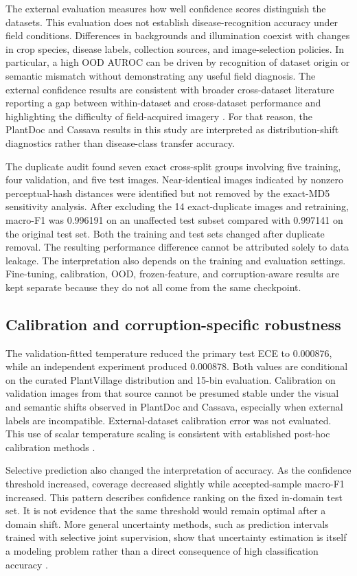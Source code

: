 \documentclass{sbc2023}%
\begin{document}
The external evaluation measures how well confidence scores distinguish the datasets. This evaluation does not establish disease-recognition accuracy under field conditions. Differences in backgrounds and illumination coexist with changes in crop species, disease labels, collection sources, and image-selection policies. In particular, a high OOD AUROC can be driven by recognition of dataset origin or semantic mismatch without demonstrating any useful field diagnosis. The external confidence results are consistent with broader cross-dataset literature reporting a gap between within-dataset and cross-dataset performance and highlighting the difficulty of field-acquired imagery \cite{r39,r14}. For that reason, the PlantDoc and Cassava results in this study are interpreted as distribution-shift diagnostics rather than disease-class transfer accuracy.

The duplicate audit found seven exact cross-split groups involving five training, four validation, and five test images. Near-identical images indicated by nonzero perceptual-hash distances were identified but not removed by the exact-MD5 sensitivity analysis. After excluding the 14 exact-duplicate images and retraining, macro-F1 was 0.996191 on an unaffected test subset compared with 0.997141 on the original test set. Both the training and test sets changed after duplicate removal. The resulting performance difference cannot be attributed solely to data leakage. The interpretation also depends on the training and evaluation settings. Fine-tuning, calibration, OOD, frozen-feature, and corruption-aware results are kept separate because they do not all come from the same checkpoint.

\subsection{Calibration and corruption-specific robustness}
The validation-fitted temperature reduced the primary test ECE to 0.000876, while an independent experiment produced 0.000878. Both values are conditional on the curated PlantVillage distribution and 15-bin evaluation. Calibration on validation images from that source cannot be presumed stable under the visual and semantic shifts observed in PlantDoc and Cassava, especially when external labels are incompatible. External-dataset calibration error was not evaluated. This use of scalar temperature scaling is consistent with established post-hoc calibration methods \cite{r04,r21}.

Selective prediction also changed the interpretation of accuracy. As the confidence threshold increased, coverage decreased slightly while accepted-sample macro-F1 increased. This pattern describes confidence ranking on the fixed in-domain test set. It is not evidence that the same threshold would remain optimal after a domain shift. More general uncertainty methods, such as prediction intervals trained with selective joint supervision, show that uncertainty estimation is itself a modeling problem rather than a direct consequence of high classification accuracy \cite{r25}.
\end{document}

